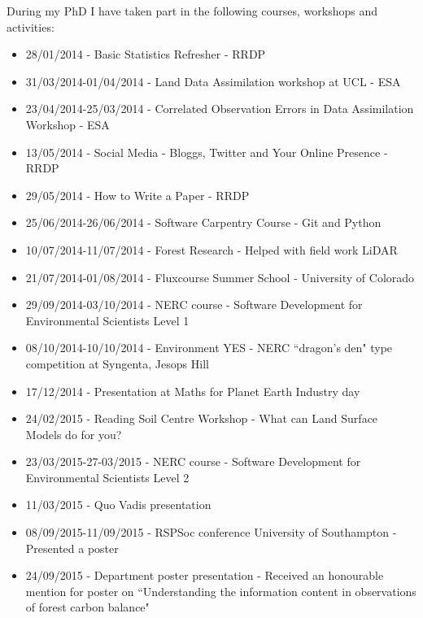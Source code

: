 \documentclass[11pt]{article}
\begin{document}
During my PhD I have taken part in the following courses, workshops and activities:
\begin{itemize}
\item 28/01/2014 - Basic Statistics Refresher - RRDP

\item 31/03/2014-01/04/2014 - Land Data Assimilation workshop at UCL - ESA

\item 23/04/2014-25/03/2014 - Correlated Observation Errors in Data Assimilation Workshop - ESA

\item 13/05/2014 - Social Media - Bloggs, Twitter and Your Online Presence - RRDP

\item 29/05/2014 - How to Write a Paper - RRDP

\item 25/06/2014-26/06/2014 - Software Carpentry Course - Git and Python

\item 10/07/2014-11/07/2014 - Forest Research - Helped with field work LiDAR

\item 21/07/2014-01/08/2014 - Fluxcourse Summer School - University of Colorado

\item 29/09/2014-03/10/2014 - NERC course - Software Development for Environmental Scientists Level 1

\item 08/10/2014-10/10/2014 - Environment YES - NERC ``dragon's den" type competition at Syngenta, Jesops Hill

\item 17/12/2014 - Presentation at Maths for Planet Earth Industry day

\item 24/02/2015 - Reading Soil Centre Workshop - What can Land Surface Models do for you?

\item 23/03/2015-27-03/2015 - NERC course - Software Development for Environmental Scientists Level 2

\item 11/03/2015 - Quo Vadis presentation

\item 08/09/2015-11/09/2015 - RSPSoc conference University of Southampton - Presented a poster

\item 24/09/2015 - Department poster presentation - Received an honourable mention for poster on ``Understanding the information content in observations of forest carbon balance"


\end{itemize}
\end{document}
